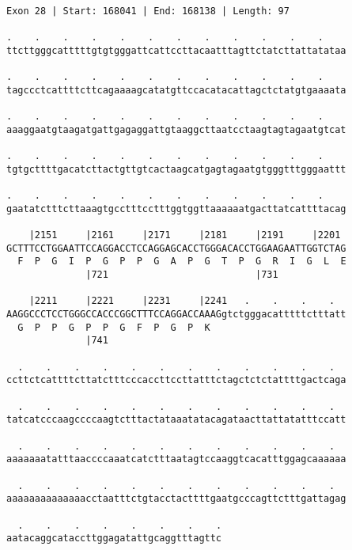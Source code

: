 \documentclass{article}
\begin{document}
\begin{Verbatim}
Exon 28 | Start: 168041 | End: 168138 | Length: 97
 
.    .    .    .    .    .    .    .    .    .    .    .    
ttcttgggcatttttgtgtgggattcattccttacaatttagttctatcttattatataa
  
.    .    .    .    .    .    .    .    .    .    .    .    
tagccctcattttcttcagaaaagcatatgttccacatacattagctctatgtgaaaata
  
.    .    .    .    .    .    .    .    .    .    .    .    
aaaggaatgtaagatgattgagaggattgtaaggcttaatcctaagtagtagaatgtcat
  
.    .    .    .    .    .    .    .    .    .    .    .    
tgtgcttttgacatcttactgttgtcactaagcatgagtagaatgtgggtttgggaattt
  
.    .    .    .    .    .    .    .    .    .    .    .    
gaatatctttcttaaagtgcctttcctttggtggttaaaaaatgacttatcattttacag
  
    |2151     |2161     |2171     |2181     |2191     |2201 
GCTTTCCTGGAATTCCAGGACCTCCAGGAGCACCTGGGACACCTGGAAGAATTGGTCTAG
  F  P  G  I  P  G  P  P  G  A  P  G  T  P  G  R  I  G  L  E
              |721                          |731            
  
    |2211     |2221     |2231     |2241   .    .    .    .  
AAGGCCCTCCTGGGCCACCCGGCTTTCCAGGACCAAAGgtctgggacatttttctttatt
  G  P  P  G  P  P  G  F  P  G  P  K                        
              |741                                          
  
  .    .    .    .    .    .    .    .    .    .    .    .  
ccttctcattttcttatctttcccaccttccttatttctagctctctattttgactcaga
  
  .    .    .    .    .    .    .    .    .    .    .    .  
tatcatcccaagccccaagtctttactataaatatacagataacttattatatttccatt
  
  .    .    .    .    .    .    .    .    .    .    .    .  
aaaaaaatatttaaccccaaatcatctttaatagtccaaggtcacatttggagcaaaaaa
  
  .    .    .    .    .    .    .    .    .    .    .    .  
aaaaaaaaaaaaaacctaatttctgtacctacttttgaatgcccagttctttgattagag
  
  .    .    .    .    .    .    .    .
aatacaggcataccttggagatattgcaggtttagttc
\end{Verbatim}
\newpage
\end{document}

